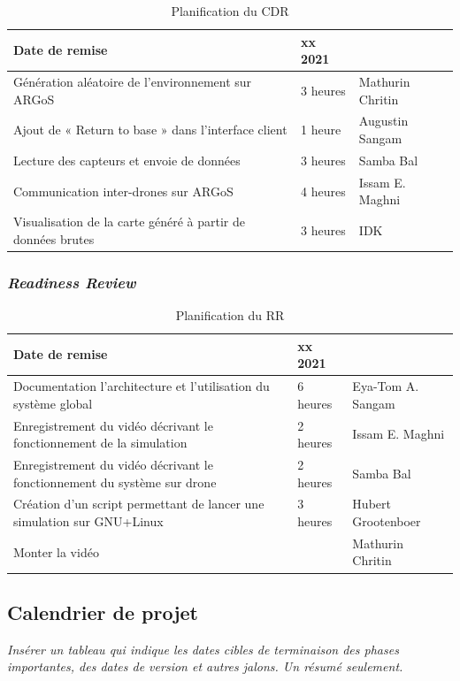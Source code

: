 \documentclass{mistcoursedoc}
\begin{document}
\begin{table}[h!]
  \centering
  \begin{tabular}{ M{7cm}M{3cm}M{3.5cm} }\hline
    Date de remise                                              & xx 2021  & \tabularnewline\hline
    Génération aléatoire de l’environnement sur ARGoS           & 3 heures & Mathurin Chritin \tabularnewline
    Ajout de « Return to base » dans l’interface client         & 1 heure  & Augustin Sangam \tabularnewline
    Lecture des capteurs et envoie de données                   & 3 heures & Samba Bal \tabularnewline
    Communication inter-drones sur ARGoS                        & 4 heures & Issam E. Maghni \tabularnewline
    Visualisation de la carte généré à partir de données brutes & 3 heures & IDK \tabularnewline\hline
  \end{tabular}
  \caption{Planification du CDR}
\end{table}

\newpage\subsubsection{\emph{Readiness Review}}

\begin{table}[h!]
  \centering
  \begin{tabular}{M{7cm}M{3cm}M{3.5cm}}\hline
    Date de remise                                                           & xx 2021  & \tabularnewline\hline

    Documentation l’architecture et l’utilisation du système global          & 6 heures & Eya-Tom A. Sangam\tabularnewline
    Enregistrement du vidéo décrivant le fonctionnement de la simulation     & 2 heures & Issam E. Maghni \tabularnewline
    Enregistrement du vidéo décrivant le fonctionnement du système sur drone & 2 heures & Samba Bal \tabularnewline
    Création d’un script permettant de lancer une simulation sur GNU+Linux   & 3 heures & Hubert Grootenboer \tabularnewline
    Monter la vidéo                                                          &          & Mathurin Chritin\tabularnewline\hline
  \end{tabular}
  \caption{Planification du RR}
\end{table}

\subsection{Calendrier de projet}\label{calendrier}

\textit{Insérer un tableau qui indique les dates cibles de terminaison des phases importantes, des dates de version et autres jalons.  Un résumé seulement.}
\end{document}
